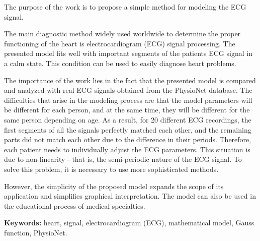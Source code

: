 \documentclass[
]{article}
\begin{document}
The purpose of the work is to propose a simple method for modeling the
ECG signal.

The main diagnostic method widely used worldwide to determine the proper
functioning of the heart is electrocardiogram (ECG) signal processing.
The presented model fits well with important segments of the
patient\textquotesingle s ECG signal in a calm state. This condition can
be used to easily diagnose heart problems.

The importance of the work lies in the fact that the presented model is
compared and analyzed with real ECG signals obtained from the PhysioNet
database. The difficulties that arise in the modeling process are that
the model parameters will be different for each person, and at the same
time, they will be different for the same person depending on age. As a
result, for 20 different ECG recordings, the first segments of all the
signals perfectly matched each other, and the remaining parts did not
match each other due to the difference in their periods. Therefore, each
patient needs to individually adjust the ECG parameters. This situation
is due to non-linearity - that is, the semi-periodic nature of the ECG
signal. To solve this problem, it is necessary to use more sophisticated
methods.

However, the simplicity of the proposed model expands the scope of its
application and simplifies graphical interpretation. The model can also
be used in the educational process of medical specialties.

\textbf{Keywords:} heart, signal, electrocardiogram (ECG), mathematical
model, Gauss function, PhysioNet.
\end{document}
